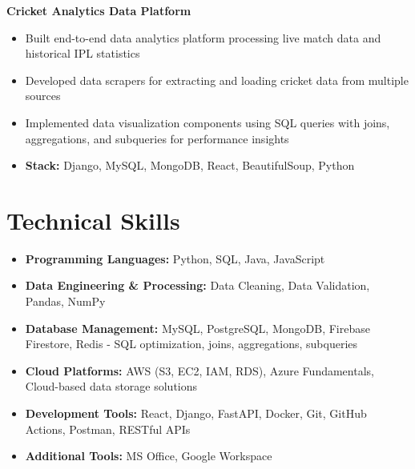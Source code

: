 \documentclass[10pt, letterpaper]{article}
\newenvironment{highlights}{
    \begin{itemize}[
        topsep=0.1cm,
        parsep=0.1cm,
        itemsep=3pt,
        leftmargin=10pt
    ]
}{
    \end{itemize}
}
\newenvironment{twocolentry}[2][]{
    \noindent\textbf{#2} \hfill {\small #1}\par
}{}
\begin{document}
\begin{twocolentry}{Cricket Analytics Data Platform}
\end{twocolentry}
\begin{highlights}
    \item Built end-to-end data analytics platform processing live match data and historical IPL statistics
    \item Developed data scrapers for extracting and loading cricket data from multiple sources
    \item Implemented data visualization components using SQL queries with joins, aggregations, and subqueries for performance insights
    \item \textbf{Stack:} Django, MySQL, MongoDB, React, BeautifulSoup, Python
\end{highlights}

\section{Technical Skills}
\begin{highlights}
    \item \textbf{Programming Languages:} Python, SQL, Java, JavaScript
    \item \textbf{Data Engineering \& Processing:} Data Cleaning, Data Validation, Pandas, NumPy
    \item \textbf{Database Management:} MySQL, PostgreSQL, MongoDB, Firebase Firestore, Redis - SQL optimization, joins, aggregations, subqueries
    \item \textbf{Cloud Platforms:} AWS (S3, EC2, IAM, RDS), Azure Fundamentals, Cloud-based data storage solutions
    \item \textbf{Development Tools:} React, Django, FastAPI, Docker, Git, GitHub Actions, Postman, RESTful APIs
    \item \textbf{Additional Tools:} MS Office, Google Workspace
\end{highlights}
\end{document}
